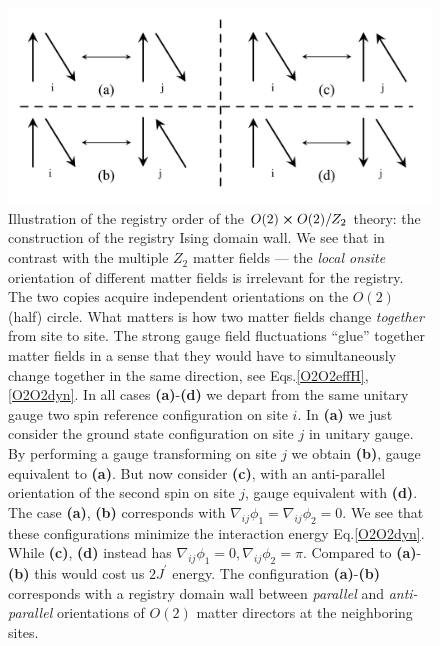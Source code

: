 \begin{figure}[!h]
	\centering
	\includegraphics[scale=.5]{figures/chapter2/O2xO2Z2order.pdf}
	\caption{Illustration of the registry order of the  $O(2)\cross O(2) / Z_2$ theory: the construction of the registry Ising domain wall. We see that in contrast with the multiple $Z_2$ matter fields --- the \textit{local onsite} orientation of different matter fields is irrelevant for the registry. The two copies acquire independent orientations on the $O(2)$ (half) circle.   
		What matters is how two matter fields change {\em together} from site to site. The strong gauge field fluctuations ``glue'' together matter fields in a sense that they would have to simultaneously change together in the same direction, see Eqs.\eqref{O2O2effH},\eqref{O2O2dyn}.  In all cases \textbf{(a)}-\textbf{(d)} we depart from the same unitary gauge two spin reference configuration on site $i$. In \textbf{(a)} we just consider the ground state configuration on site $j$ in unitary gauge. By performing a gauge transforming on site $j$ we obtain  \textbf{(b)}, gauge equivalent  to \textbf{(a)}. But now consider  \textbf{(c)}, with an anti-parallel orientation of the second spin on site $j$, %
		gauge equivalent with \textbf{(d)}. 
		The case 	\textbf{(a)}, \textbf{(b)} corresponds with $\nabla_{ij} \phi_1 = \nabla_{ij} \phi_2=0$. We see that these configurations minimize the interaction energy Eq.\eqref{O2O2dyn}.  While \textbf{(c)}, \textbf{(d)} instead has $\nabla_{ij} \phi_1 =  0, \nabla_{ij} \phi_2=\pi$. Compared to \textbf{(a)}-\textbf{(b)} this would cost us $2J^{\prime}$ energy. The configuration \textbf{(a)}-\textbf{(b)} corresponds with a registry domain wall  between \textit{parallel} and \textit{anti-parallel} orientations of $O(2)$ matter directors at the neighboring sites.}
	\label{O2O2Z2order}
\end{figure}




